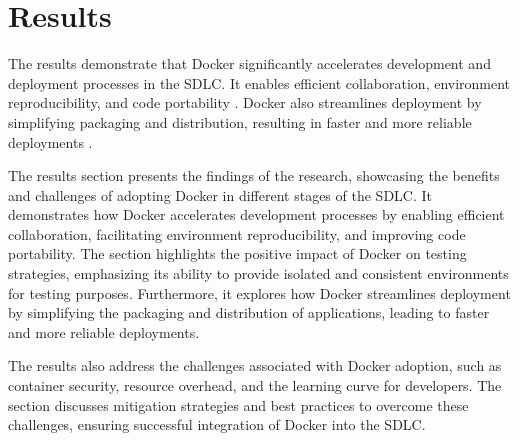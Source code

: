 \section{Results}

The results demonstrate that Docker significantly accelerates development and deployment processes in the SDLC. It enables efficient collaboration, environment reproducibility, and code portability \citep{fink2018docker,franken2016using}. Docker also streamlines deployment by simplifying packaging and distribution, resulting in faster and more reliable deployments \citep{boettiger2017package,tanenbaum2019introduction}.

The results section presents the findings of the research, showcasing the benefits and challenges of adopting Docker in different stages of the SDLC. It demonstrates how Docker accelerates development processes by enabling efficient collaboration, facilitating environment reproducibility, and improving code portability. The section highlights the positive impact of Docker on testing strategies, emphasizing its ability to provide isolated and consistent environments for testing purposes. Furthermore, it explores how Docker streamlines deployment by simplifying the packaging and distribution of applications, leading to faster and more reliable deployments.

The results also address the challenges associated with Docker adoption, such as container security, resource overhead, and the learning curve for developers. The section discusses mitigation strategies and best practices to overcome these challenges, ensuring successful integration of Docker into the SDLC.